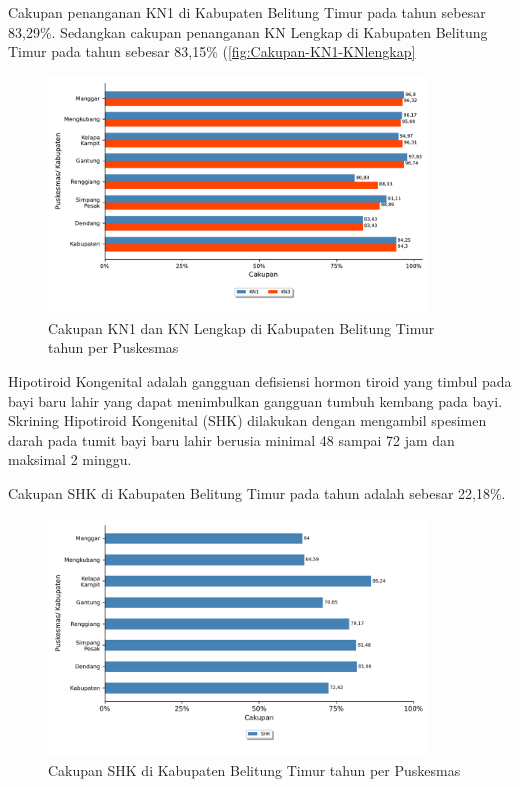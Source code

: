 Cakupan penanganan KN1 di Kabupaten Belitung Timur pada tahun \tP sebesar 83,29\%.
Sedangkan cakupan penanganan KN Lengkap di Kabupaten Belitung Timur pada tahun \tP sebesar 83,15\% (\autoref{fig:Cakupan-KN1-KNlengkap}


\begin{figure}[H]
    \centering
    \includegraphics[width=0.9\textwidth]{bab_05/bab_05_14_KN1KN3}
    \caption{Cakupan KN1 dan KN Lengkap di Kabupaten Belitung Timur tahun \tP per Puskesmas}
    \label{fig:Cakupan-KN1-KNlengkap}
\end{figure}


Hipotiroid Kongenital adalah gangguan defisiensi hormon tiroid yang timbul pada bayi baru lahir yang dapat menimbulkan gangguan tumbuh kembang pada bayi.
Skrining Hipotiroid Kongenital (SHK) dilakukan dengan mengambil spesimen darah pada tumit bayi baru lahir berusia minimal 48 sampai 72 jam dan maksimal 2 minggu.

Cakupan SHK di Kabupaten Belitung Timur pada tahun \tP adalah sebesar 22,18\%.

\begin{figure}[H]
	\centering
	    \includegraphics[width=0.9\textwidth]{bab_05/bab_05_14c_SHK}
	\caption{Cakupan SHK di Kabupaten Belitung Timur tahun \tP per Puskesmas}
	\label{fig:Cakupan-SHK}
\end{figure}

